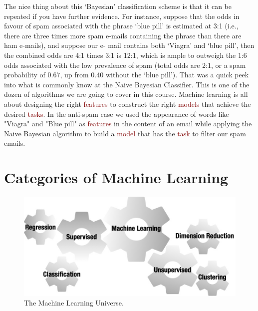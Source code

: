 \documentclass{tufte-handout}
\newcommand{\hlred}[1]{\textcolor{Maroon}{#1}}%
\begin{document}
The nice thing about this ‘Bayesian’ classification scheme is that it can be repeated if you have further evidence. For instance, suppose that the odds in favour of spam associated with the phrase ‘blue pill’ is estimated at 3:1 (i.e., there are three times more spam e-mails containing the phrase than there are ham e-mails), and suppose our e- mail contains both ‘Viagra’ and ‘blue pill’, then the combined odds are 4:1 times 3:1 is 12:1, which is ample to outweigh the 1:6 odds associated with the low prevalence of spam (total odds are 2:1, or a spam probability of 0.67, up from 0.40 without the ‘blue pill’).
That was a quick peek into what is commonly know at the Naive Bayesian Classifier. This is one of the dozen of algorithms we are going to cover in this course. Machine learning is all about designing the right \hlred{features} to construct the right \hlred{models} that achieve the desired \hlred{tasks}. In the anti-spam case we used the appearance of words like "Viagra" and "Blue pill" as \hlred{features} in the content of an email while applying the Naive Bayesian algorithm to build a \hlred{model} that has the \hlred{task} to filter our spam emails. 




\section{Categories of Machine Learning}\label{sec:python-basics}

\begin{figure}[h]%
  \includegraphics[width=\linewidth]{Categories.jpg}
  \caption{The Machine Learning Universe.}
  \label{fig:syllabus}
\end{figure}
\end{document}
